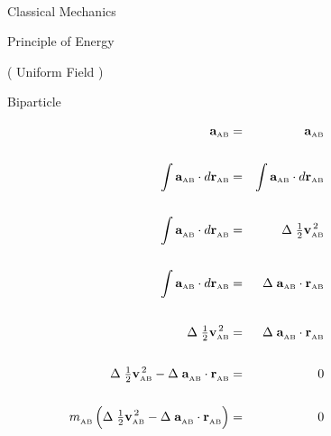 \documentclass[12pt]{article}
\newcommand{\mM}{m}
\newcommand{\dos}{^{\,2}}
\newcommand{\vR}{\mathbf{r}}
\newcommand{\vV}{\mathbf{v}}
\newcommand{\vA}{\mathbf{a}}
\newcommand{\rab}{_{\scriptscriptstyle \mathrm {AB}}}
\begin{document}
\newpage

\pagestyle{empty}

\begin{center}

\ \vspace{-0.3em}

{\fontsize{24}{24}\selectfont Classical Mechanics}

\bigskip \bigskip

{\fontsize{15}{15}\selectfont Principle of Energy}

\bigskip \bigskip

{\fontsize{13}{13}\selectfont ( Uniform Field )}

\bigskip \bigskip

{\fontsize{14}{14}\selectfont Biparticle}

\end{center}

\vspace{-0.6em}

\begin{eqnarray*}
\hspace{-6.00em}\vA\rab & = & \vA\rab \\ \\
\hspace{-6.00em}\int \vA\rab \cdot d\vR\rab & = & \int \vA\rab \cdot d\vR\rab \\ \\
\hspace{-6.00em}\int \vA\rab^{\vphantom{\dos}} \cdot d\vR\rab^{\vphantom{\dos}} & = & \Delta \; {\textstyle \frac{1}{2}}\vV\rab\dos \\ \\
\hspace{-6.00em}\int \vA\rab \cdot d\vR\rab & = & \Delta \; \vA\rab \cdot \vR\rab \\ \\
\hspace{-6.00em}\Delta \; {\textstyle \frac{1}{2}}\vV\rab\dos & = & \Delta \; \vA\rab^{\vphantom{\dos}} \cdot \vR\rab^{\vphantom{\dos}} \\ \\
\hspace{-6.00em}\Delta \; {\textstyle \frac{1}{2}}\vV\rab\dos - \Delta \; \vA\rab^{\vphantom{\dos}} \cdot \vR\rab^{\vphantom{\dos}} & = & 0 \\ \\
\hspace{-6.00em}\mM\rab^{\vphantom{\dos}} \left( \Delta \; {\textstyle \frac{1}{2}}\vV\rab\dos - \Delta \; \vA\rab^{\vphantom{\dos}} \cdot \vR\rab^{\vphantom{\dos}} \right) & = & 0
\end{eqnarray*}
\end{document}
